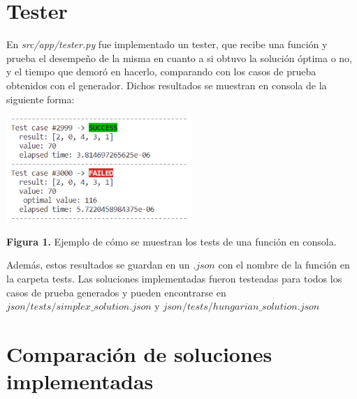 \documentclass[10pt]{article} %
\begin{document}
	\section{Tester}
	 En \textit{src/app/tester.py} fue implementado un tester, que recibe una funci\'on y prueba el desempe\~no de la misma en cuanto a si obtuvo la soluci\'on \'optima o no, y el tiempo que demor\'o en hacerlo, comparando con los casos de prueba obtenidos con el generador. Dichos resultados se muestran en consola de la siguiente forma:
	 	 \begin{center}
	 		\includegraphics[width=7cm]{tester_sample.png}
	 		
	 		\tiny{\textbf{Figura 1.} Ejemplo de c\'omo se muestran los tests de una funci\'on en consola.} 
	 	\end{center}
 	 
 	 Adem\'as, estos resultados se guardan en un $ .json $ con el nombre de la funci\'on en la carpeta tests. Las soluciones implementadas fueron testeadas para todos los casos de prueba generados y pueden encontrarse en $ json/tests/simplex\_solution.json $ y $ json/tests/hungarian\_solution.json $
	
	\section{Comparaci\'on de soluciones implementadas}
	
\end{document}
